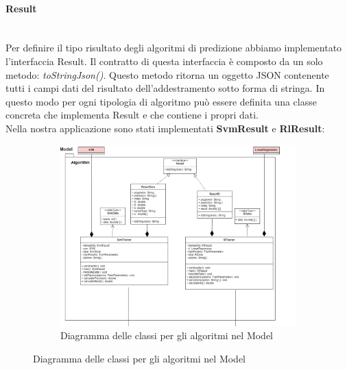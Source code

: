 		\paragraph*{Result} \mbox{} \\[1mm]
		Per definire il tipo risultato degli algoritmi di predizione abbiamo implementato l'interfaccia Result. Il contratto di questa interfaccia è composto da un solo metodo: \textit{toStringJson()}. Questo metodo ritorna un oggetto JSON contenente tutti i campi dati del risultato dell'addestramento sotto forma di stringa. In questo modo per ogni tipologia di algoritmo può essere definita una classe concreta che implementa Result e che contiene i propri dati. \\
		Nella nostra applicazione sono stati implementati \textbf{SvmResult} e \textbf{RlResult}:
		\mbox{}
		\begin{landscape}
			\begin{figure}
				\begin{figure} [H]
					\includegraphics[width=\linewidth]{img/Diagrammi/algorithm-app.png}
					\caption{Diagramma delle classi per gli algoritmi nel Model}
				\end{figure}
			\end{figure}
		\end{landscape}
